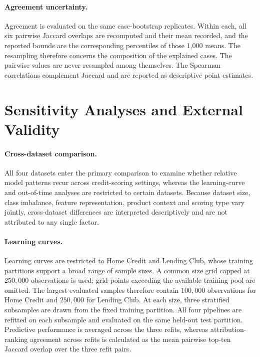 \paragraph{Agreement uncertainty.}
Agreement is evaluated on the same case-bootstrap replicates. Within each, all six
pairwise Jaccard overlaps are recomputed and their mean recorded, and the reported
bounds are the corresponding percentiles of those 1{,}000 means. The resampling
therefore concerns the composition of the explained cases. The pairwise values are
never resampled among themselves. The Spearman correlations complement Jaccard and are
reported as descriptive point estimates.


\section{Sensitivity Analyses and External Validity}\label{sec:robustness}

\paragraph{Cross-dataset comparison.}
All four datasets enter the primary comparison to examine whether relative model
patterns recur across credit-scoring settings, whereas the learning-curve and
out-of-time analyses are restricted to certain datasets. Because dataset size, class
imbalance, feature representation, product context and scoring type vary jointly, cross-dataset differences are interpreted descriptively
and are not attributed to any single factor.


\paragraph{Learning curves.}
Learning curves are restricted to Home Credit and Lending Club, whose training
partitions support a broad range of sample sizes. A common size grid capped at
$250{,}000$ observations is used; grid points exceeding the available training pool
are omitted. The largest evaluated samples therefore contain $100{,}000$ observations
for Home Credit and $250{,}000$ for Lending Club. At each size, three stratified
subsamples are drawn from the fixed training partition. All four pipelines are refitted
on each subsample and evaluated on the same held-out test partition. Predictive
performance is averaged across the three refits, whereas attribution-ranking agreement
across refits is calculated as the mean pairwise top-ten Jaccard overlap over the three
refit pairs.

